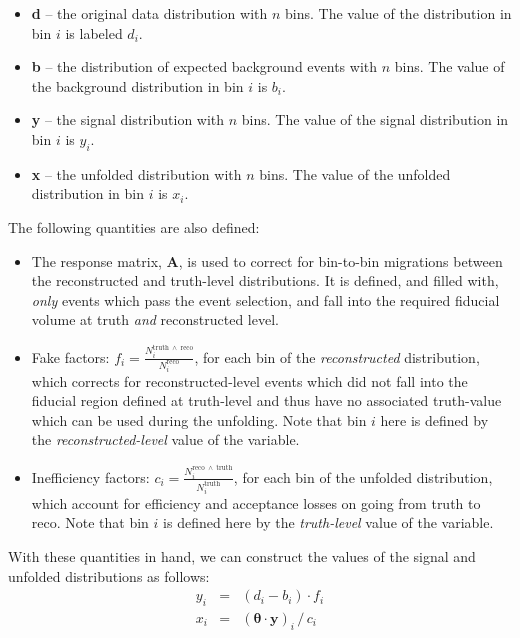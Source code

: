 \begin{itemize}
  \item \textbf{d} -- the original data distribution with $n$ bins. The value of the distribution in bin $i$ is labeled $d_{i}$.
  \item \textbf{b} -- the distribution of expected background events with $n$ bins. The value of the background distribution in bin $i$ is $b_{i}$.
  \item \textbf{y} -- the signal distribution with $n$ bins. The value of the signal distribution in bin $i$ is $y_{i}$.
  \item \textbf{x} -- the unfolded distribution with $n$ bins. The value of the unfolded distribution in bin $i$ is $x_{i}$.
\end{itemize}

The following quantities are also defined:
\begin{itemize}
  \item The response matrix, \textbf{A}, is used to correct for bin-to-bin migrations between the reconstructed
  and truth-level distributions. It is defined, and filled with, \emph{only} events which pass the event selection,
  and fall into the required fiducial volume at truth \emph{and} reconstructed level.
  \item Fake factors: $f_{i} = \frac{N^\mathrm{truth\;\wedge\;reco}_{i}}{N^\text{reco}_{i}}$, for each bin of the \emph{reconstructed}
  distribution, which corrects for reconstructed-level events which did not fall into the fiducial region defined
  at truth-level and thus have no associated truth-value which can be used during the unfolding. Note that bin $i$
  here is defined by the \emph{reconstructed-level} value of the variable.
  \item Inefficiency factors: $c_{i} = \frac{N^\mathrm{reco\;\wedge\;truth}_{i}}{N^\mathrm{truth}_{i}}$, for each bin of the
  unfolded distribution, which account for efficiency and acceptance losses on going from truth to reco.
  Note that bin $i$ is defined here by the \emph{truth-level} value of the variable.
\end{itemize}

With these quantities in hand, we can construct the values of the signal and unfolded distributions as follows:
\begin{equation}
\label{eq:corrections}
\begin{array} {rcl} 
  y_i & = & (d_i - b_i) \cdot f_i \\
    x_i & = & (\boldsymbol{\theta} \cdot \mathbf{y})_i\,/\,c_i
    \end{array}
    \end{equation}
   
